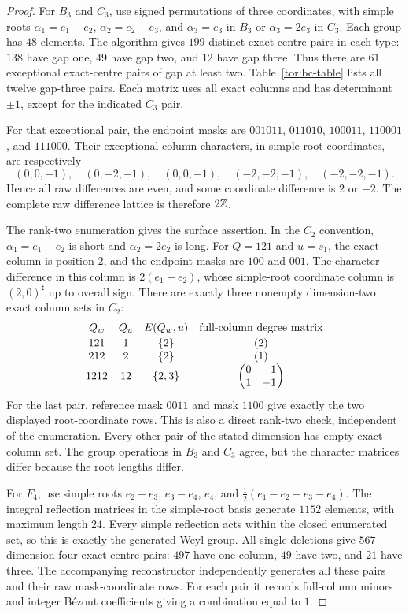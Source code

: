 \begin{proof}
For $B_3$ and $C_3$, use signed permutations of three coordinates, with simple roots $\alpha_1=e_1-e_2$, $\alpha_2=e_2-e_3$, and $\alpha_3=e_3$ in $B_3$ or $\alpha_3=2e_3$ in $C_3$. Each group has $48$ elements. The algorithm gives $199$ distinct exact-centre pairs in each type: $138$ have gap one, $49$ have gap two, and $12$ have gap three. Thus there are $61$ exceptional exact-centre pairs of gap at least two. Table~\ref{tor:bc-table} lists all twelve gap-three pairs. Each matrix uses all exact columns and has determinant $\pm1$, except for the indicated $C_3$ pair.

For that exceptional pair, the endpoint masks are $001011$, $011010$, $100011$, $110001$, and $111000$. Their exceptional-column characters, in simple-root coordinates, are respectively
\[
 (0,0,-1),\quad (0,-2,-1),\quad (0,0,-1),\quad
 (-2,-2,-1),\quad (-2,-2,-1).
\]
Hence all raw differences are even, and some coordinate difference is $2$ or $-2$. The complete raw difference lattice is therefore $2\mathbb Z$.

The rank-two enumeration gives the surface assertion. In the $C_2$ convention, $\alpha_1=e_1-e_2$ is short and $\alpha_2=2e_2$ is long. For $Q=121$ and $u=s_1$, the exact column is position $2$, and the endpoint masks are $100$ and $001$. The character difference in this column is $2(e_1-e_2)$, whose simple-root coordinate column is $(2,0)^{\mathsf t}$ up to overall sign. There are exactly three nonempty dimension-two exact column sets in $C_2$:
\[
\begin{array}{c c c c}
 Q_w&Q_u&E(Q_w,u)&\text{full-column degree matrix}\\[2pt]
 121&1&\{2\}&(2)\\
 212&2&\{2\}&(1)\\
 1212&12&\{2,3\}&\begin{pmatrix}0&-1\\1&-1\end{pmatrix}
\end{array}
\]
For the last pair, reference mask $0011$ and mask $1100$ give exactly the two displayed root-coordinate rows. This is also a direct rank-two check, independent of the enumeration. Every other pair of the stated dimension has empty exact column set. The group operations in $B_3$ and $C_3$ agree, but the character matrices differ because the root lengths differ.

For $F_4$, use simple roots $e_2-e_3$, $e_3-e_4$, $e_4$, and $\tfrac12(e_1-e_2-e_3-e_4)$. The integral reflection matrices in the simple-root basis generate $1152$ elements, with maximum length $24$. Every simple reflection acts within the closed enumerated set, so this is exactly the generated Weyl group. All single deletions give $567$ dimension-four exact-centre pairs: $497$ have one column, $49$ have two, and $21$ have three. The accompanying reconstructor independently generates all these pairs and their raw mask-coordinate rows. For each pair it records full-column minors and integer B\'ezout coefficients giving a combination equal to $1$.


\end{proof}
